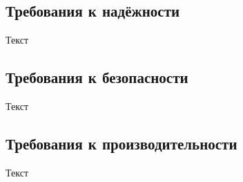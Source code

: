 \documentclass[../document.tex]{subfiles}
\begin{document}
\subsection{Требования к надёжности}
\par Текст
\subsection{Требования к безопасности}
\par Текст
\subsection{Требования к производительности}
\par Текст
\end{document}

